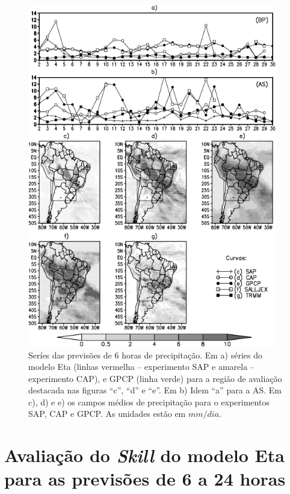 \begin{figure}[!hbp]
\centering
\includegraphics[height=15cm]{./figs/serie_precipitacao-FCT06h.png}
\caption{Seríes das previsões de 6 horas de precipitação. Em a) séries do modelo Eta (linhas vermelha – experimento SAP e amarela – experimento CAP), e GPCP (linha verde) para a região de avaliação destacada nas figuras ``c'', ``d'' e ``e''. Em b) Idem ``a'' para a AS. Em c), d) e e) os campos médios de precipitação para o experimentos SAP, CAP e GPCP. As unidades estão em $mm/dia$.}
\label{fig52}
\end{figure}


\break

\section{Avaliação do \textit{Skill} do modelo Eta para as previsões de 6 a 24 horas}
\label{ss:avalskill}

